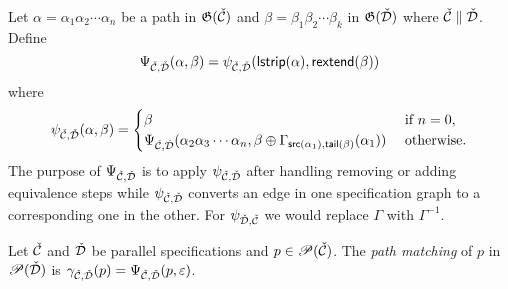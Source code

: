 Let $\alpha = \alpha_1\alpha_2 \dotsm \alpha_n$ be a path in $\mathfrak{G}(\check{\mathcal{C}})$ and $\beta = \beta_1\beta_2\dotsm \beta_k$ in $\mathfrak{G}(\check{\mathcal{D}})$ where $\check{\mathcal{C}} \parallel \check{\mathcal{D}}$. Define
\[
    \Psi_{\check{\mathcal{C}},\check{\mathcal{D}}}(\alpha,\beta) = \psi_{\check{\mathcal{C}},\check{\mathcal{D}}}(\textsf{lstrip}(\alpha),\textsf{rextend}(\beta)) 
\]
where
\[
    \psi_{\check{\mathcal{C}},\check{\mathcal{D}}}(\alpha,\beta) = \begin{cases}
        \beta & \text{ if } n = 0,\\
        \Psi_{\check{\mathcal{C}},\check{\mathcal{D}}}(\alpha_2\alpha_3\dotsm\alpha_n, \beta \oplus \Gamma_{\textsf{src}(\alpha_1),\textsf{tail}(\beta)}(\alpha_1)) & \text{ otherwise}.
    \end{cases}
\]
The purpose of $\Psi_{\check{\mathcal{C}},\check{\mathcal{D}}}$ is to apply $\psi_{\check{\mathcal{C}},\check{\mathcal{D}}}$ after handling removing or adding equivalence steps while $\psi_{\check{\mathcal{C}},\check{\mathcal{D}}}$ converts an edge in one specification graph to a corresponding one in the other. For $\psi_{\check{\mathcal{D}},\check{\mathcal{C}}}$ we would replace $\Gamma$ with $\Gamma^{-1}$.

\begin{definition}\label{def:pathmatch}
Let $\check{\mathcal{C}}$ and $\check{\mathcal{D}}$ be parallel specifications and $p \in \mathscr{P}(\check{\mathcal{C}})$. The \emph{path matching} of $p$ in $\mathscr{P}(\check{\mathcal{D}})$ is $\gamma_{\check{\mathcal{C}},\check{\mathcal{D}}}(p) = \Psi_{\check{\mathcal{C}},\check{\mathcal{D}}}(p,\varepsilon)$.
\end{definition}

